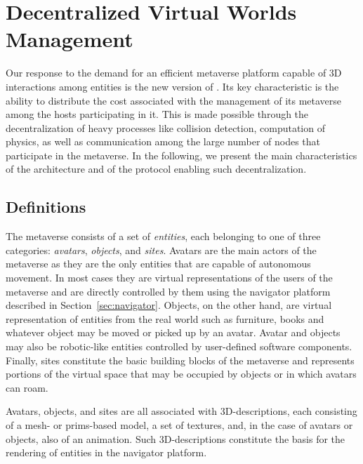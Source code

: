 \section{Decentralized Virtual Worlds Management}
\label{sec:decentr-virt-worlds}
Our response to the demand for an efficient metaverse platform capable
of 3D interactions among entities is the new version of \sol.  Its key
characteristic is the ability to distribute the cost associated with
the management of its metaverse among the hosts participating in
it. This is made possible through the decentralization of heavy
processes like collision detection, computation of physics, as well as
communication among the large number of nodes that participate in the
metaverse. In the following, we present the main characteristics of
the architecture and of the protocol enabling such
decentralization. 

\subsection{Definitions}
\label{sec:definitions}
The \sol metaverse consists of a set of \emph{entities}, each
belonging to one of three categories: \emph{avatars}, \emph{objects},
and \emph{sites}. Avatars are the main actors of the metaverse as they
are the only entities that are capable of autonomous movement. In most
cases they are virtual representations of the users of the metaverse
and are directly controlled by them using the navigator platform
described in Section~\ref{sec:navigator}.  Objects, on the other hand,
are virtual representation of entities from the real world such as
furniture, books and whatever object may be moved or picked up by an
avatar. Avatar and objects may also be robotic-like entities 
controlled by user-defined software components. Finally, sites
constitute the basic building blocks of the metaverse and represents
portions of the virtual space that may be occupied by objects or in
which avatars can roam.

Avatars, objects, and sites are all associated with 3D-descriptions,
each consisting of a mesh- or prims-based model, a set of textures,
and, in the case of avatars or objects, also of an animation.  Such
3D-descriptions constitute the basis for the rendering of entities in
the navigator platform.

